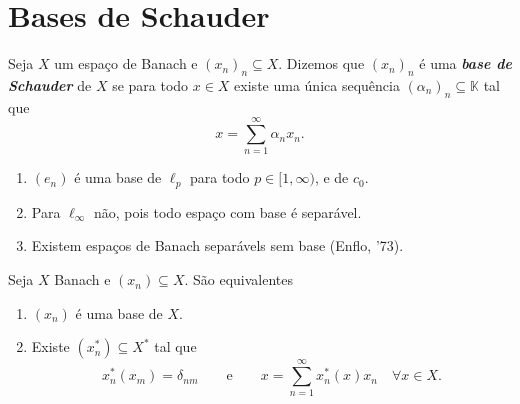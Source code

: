 \documentclass[portuguese]{article}
\theoremstyle{definition}
\begin{document}
\section{Bases de Schauder}
\begin{defn}
	Seja $X$ um espaço de Banach e $(x_n)_n\subseteq X$. Dizemos que $(x_n)_n$ é uma \textbf{\textit{base de Schauder}} de $X$ se para todo $x\in X$ existe uma única sequência $(\alpha_n)_n\subseteq \mathbb{K}$ tal que
	\[x=\sum_{n=1}^\infty \alpha_n x_n.\]
\end{defn}
\begin{exemplos}\leavevmode
	\begin{enumerate}
		\item $(e_n)$ é uma base de $\ell_p$ para todo $p\in[1,\infty)$, e de $c_0$.
		\item Para $\ell_\infty$ não, pois todo espaço com base é separável.
		\item Existem espaços de Banach separávels sem base (Enflo, '73).
	\end{enumerate}
\end{exemplos}
\begin{teo}
	Seja $X$ Banach e $(x_n)\subseteq X$. São equivalentes
	\begin{enumerate}
		\item $(x_n)$ é uma base de $X$.
		\item Existe $(x^*_n)\subseteq X^*$ tal que
		\[x_n^*(x_m)=\delta_{nm}\qquad\text{e}\qquad x=\sum_{n=1}^\infty x^*_n(x)x_n\quad\forall x\in X.\]
	\end{enumerate}
\end{teo}
\end{document}

